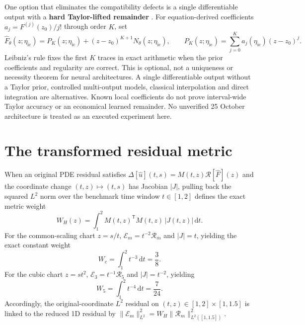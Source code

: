 \documentclass[11pt,a4paper,oneside]{report}
\numberwithin{equation}{chapter}
\newcommand{\E}{\mathcal E}
\newcommand{\R}{\mathcal R}
\newcommand{\dd}{\mathrm d}
\begin{document}
One option that eliminates the compatibility defects is a single differentiable
output with a \textbf{hard Taylor-lifted remainder} \cite{lagaris}.
For equation-derived coefficients $a_j=F^{(j)}(z_0)/j!$ through order $K$, set
\begin{equation}\label{eq:hardprofile}
\widehat F_\theta(z;\eta_{\mathrm{ic}})=P_K(z;\eta_{\mathrm{ic}})
 +(z-z_0)^{K+1}N_\theta(z;\eta_{\mathrm{ic}}),\qquad
 P_K(z;\eta_{\mathrm{ic}})=\sum_{j=0}^K a_j(\eta_{\mathrm{ic}})(z-z_0)^j.
\end{equation}
Leibniz's rule fixes the first $K$ traces in exact arithmetic when the prior
coefficients and regularity are correct. This is optional, not a uniqueness
or necessity theorem for neural architectures.
A single differentiable output without a Taylor prior, controlled
multi-output models, classical interpolation and direct integration are
alternatives. Known local coefficients do not prove interval-wide Taylor
accuracy or an economical learned remainder. No unverified 25 October
architecture is treated as an executed experiment here.

\section{The transformed residual metric}
When an original PDE residual satisfies $\Delta[\widehat u](t,s)=M(t,z)\R[\widehat F](z)$ and the coordinate change $(t,z)\mapsto(t,s)$ has Jacobian $|J|$, pulling back the squared $L^2$ norm over the benchmark time window $t\in[1,2]$ defines the exact metric weight
\begin{equation}\label{eq:metric}
W_H(z)=\int_{1}^{2}M(t,z)^{\mathsf T}M(t,z)\,|J(t,z)|\,\dd t.
\end{equation}
For the common-scaling chart $z=s/t$, $\E_m = t^{-2}\R_m$ and $|J|=t$, yielding the exact constant weight
\begin{equation}
W_c=\int_1^2 t^{-3}\,\dd t=\frac{3}{8}.
\end{equation}
For the cubic chart $z=st^2$, $\E_3 = t^{-1}\R_5$ and $|J|=t^{-2}$, yielding
\begin{equation}
W_5=\int_1^2 t^{-4}\,\dd t=\frac{7}{24}.
\end{equation}
Accordingly, the original-coordinate $L^2$ residual on $(t,z)\in[1,2]\times[1,1.5]$ is linked to the reduced 1D residual by $\|\E_m\|_{L^2}^2 = W_H \|\R_m\|_{L^2([1,1.5])}^2$.
\end{document}
